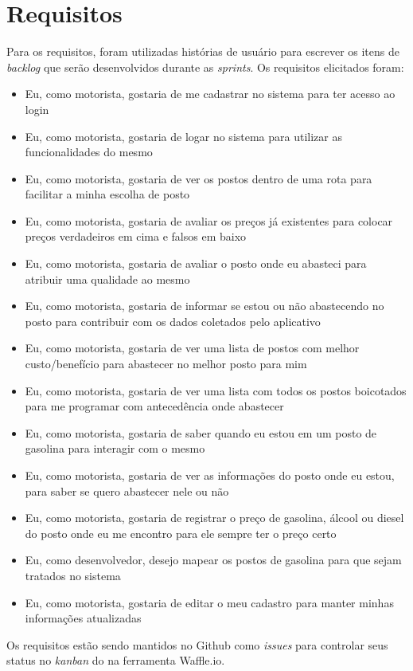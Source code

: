 \section{Requisitos}

Para os requisitos, foram utilizadas histórias de usuário para escrever os itens de \textit{backlog} que serão desenvolvidos durante as \textit{sprints}. Os requisitos elicitados foram:
\begin{itemize}
    \item Eu, como motorista, gostaria de me cadastrar no sistema para ter acesso ao login 
    \item Eu, como motorista, gostaria de logar no sistema para utilizar as funcionalidades do mesmo
    \item Eu, como motorista, gostaria de ver os postos dentro de uma rota para facilitar a minha escolha de posto
    \item Eu, como motorista, gostaria de avaliar os preços já existentes para colocar preços verdadeiros em cima e falsos em baixo
    \item Eu, como motorista, gostaria de avaliar o posto onde eu abasteci para atribuir uma qualidade ao mesmo
    \item Eu, como motorista, gostaria de informar se estou ou não abastecendo no posto para contribuir com os dados coletados pelo aplicativo
    \item Eu, como motorista, gostaria de ver uma lista de postos com melhor custo/benefício para abastecer no melhor posto para mim
    \item Eu, como motorista, gostaria de ver uma lista com todos os postos boicotados para me programar com antecedência onde abastecer
    \item Eu, como motorista, gostaria de saber quando eu estou em um posto de gasolina para interagir com o mesmo
    \item Eu, como motorista, gostaria de ver as informações do posto onde eu estou, para saber se quero abastecer nele ou não
    \item Eu, como motorista, gostaria de registrar o preço de gasolina, álcool ou diesel do posto onde eu me encontro para ele sempre ter o preço certo
    \item Eu, como desenvolvedor, desejo mapear os postos de gasolina para que sejam tratados no sistema
    \item Eu, como motorista, gostaria de editar o meu cadastro para manter minhas informações atualizadas
\end{itemize}
Os requisitos estão sendo mantidos no Github como \textit{issues} para controlar seus status no \textit{kanban} do  na ferramenta Waffle.io.
